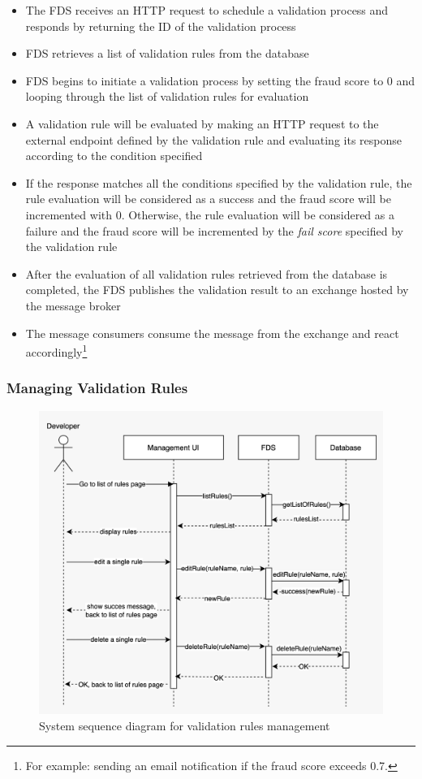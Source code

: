 \begin{itemize}
 \item The FDS receives an HTTP request to schedule a validation process and responds by returning the ID of the validation process
 \item FDS retrieves a list of validation rules from the database
 \item FDS begins to initiate a validation process by setting the fraud score to 0 and looping through the list of validation rules for evaluation
 \item A validation rule will be evaluated by making an HTTP request to the external endpoint defined by the validation rule and evaluating its response according to the condition specified
 \item If the response matches all the conditions specified by the validation rule, the rule evaluation will be considered as a success and the fraud score will be incremented with 0. Otherwise, the rule evaluation will be considered as a failure and the fraud score will be incremented by the \emph{fail score} specified by the validation rule
 \item After the evaluation of all validation rules retrieved from the database is completed, the FDS publishes the validation result to an exchange hosted by the message broker
 \item The message consumers consume the message from the exchange and react accordingly\footnote{For example: sending an email notification if the fraud score exceeds 0.7.}
\end{itemize}


\subsubsection{Managing Validation Rules}
 \label{subsection:management}

\begin{figure}[!ht]
 \includegraphics[width=\textwidth]{diagrams/sequence_management.jpeg}
 \caption{System sequence diagram for validation rules management}
 \label{fig:management_sequence}
\end{figure}

